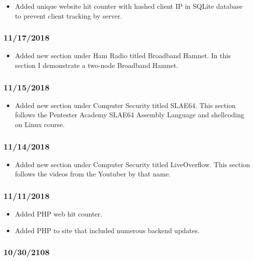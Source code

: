 \begin{itemize}
\item Added unique website hit counter with hashed client IP in SQLite database to prevent client tracking by server.
\end{itemize}

\subsubsection{11/17/2018}

\begin{itemize}
\item Added new section under Ham Radio titled Broadband Hamnet. In this section I demonstrate a two-node Broadband Hamnet.
\end{itemize}

\subsubsection{11/15/2018}

\begin{itemize}
\item Added new section under Computer Security titled SLAE64. This section follows the Pentester Academy SLAE64 Assembly Language and shellcoding on Linux course.
\end{itemize}

\subsubsection{11/14/2018}

\begin{itemize}
\item Added new section under Computer Security titled LiveOverflow. This section follows the videos from the Youtuber by that name.
\end{itemize}

\subsubsection{11/11/2018}

\begin{itemize}
\item Added PHP web hit counter.
\item Added PHP to site that included numerous backend updates.
\end{itemize}

\subsubsection{10/30/2108}

